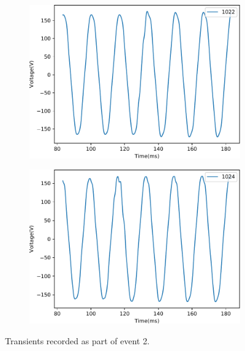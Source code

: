 \begin{figure}[!ht]
\begin{subfigure}{.45\textwidth}
        \includegraphics[width=1\linewidth]{img/napali_eval/subthreshold/ev2/trans_1022.pdf}
    \end{subfigure}\hspace{5mm}
    \begin{subfigure}{.45\textwidth}
        \centering
        \includegraphics[width=1\linewidth]{img/napali_eval/subthreshold/ev2/trans_1024.pdf}
    \end{subfigure}
    \caption{Transients recorded as part of event 2.}
    \label{expdes:fig:sub:ev2:trans}
\end{figure}
